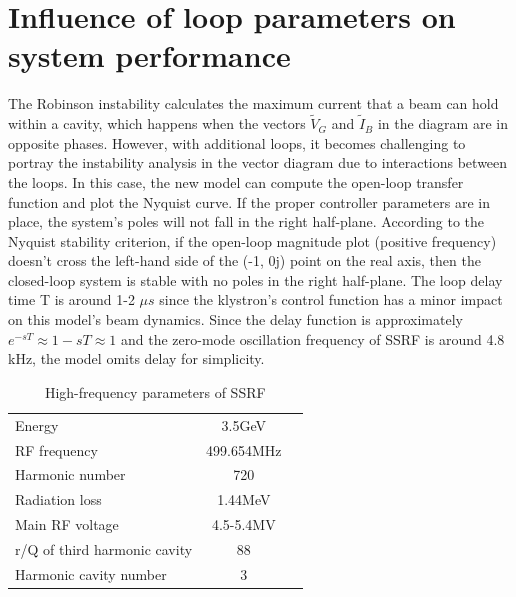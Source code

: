 \documentclass[letterpaper,
               nospread,     %
               ]{jacow}
\begin{document}
\section{Influence of loop parameters on system performance}
The Robinson instability calculates the maximum current that a beam can hold within a cavity, which happens when the vectors ${{\tilde{V}}_{G}}$ and ${{\tilde{I}}_{B}}$ in the diagram are in opposite phases. However, with additional loops, it becomes challenging to portray the instability analysis in the vector diagram due to interactions between the loops. In this case, the new model can compute the open-loop transfer function and plot the Nyquist curve. If the proper controller parameters are in place, the system’s poles will not fall in the right half-plane. According to the Nyquist stability criterion, if the open-loop magnitude plot (positive frequency) doesn't cross the left-hand side of the (-1, 0j) point on the real axis, then the closed-loop system is stable with no poles in the right half-plane. The loop delay time T is around 1-2 $\mu s$ \cite{ref13} since the klystron's control function has a minor impact on this model’s beam dynamics. Since the delay function is approximately ${e^{ - sT}} \approx 1 - sT \approx 1$ and the zero-mode oscillation frequency of SSRF is around 4.8 kHz, the model omits delay for simplicity.
\begin{table}[!hbt]
   \centering
   \caption{High-frequency parameters of SSRF\cite{ref12}\cite{ref13}}
   \begin{tabular}{lcc}
      \toprule
      \midrule
      Energy                       & 3.5GeV     \\ %
      RF frequency                 & 499.654MHz \\ %
      Harmonic number              & 720        \\ %
      Radiation loss               & 1.44MeV    \\
      Main RF voltage              & 4.5-5.4MV  \\
      r/Q of third harmonic cavity & 88         \\
      Harmonic cavity number       & 3          \\
      \bottomrule
   \end{tabular}
   \label{tab:margins}
\end{table}
\end{document}
